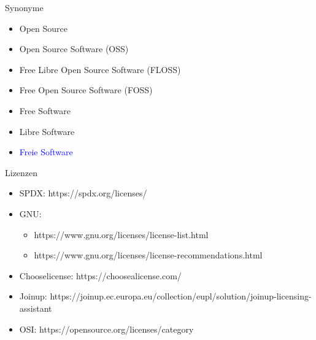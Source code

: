 



\begin{frame}
  \titlepage
\end{frame}

\begin{frame}{Synonyme}
  \begin{itemize}
  \item<1-> Open Source
  \item<4-> Open Source Software (OSS)
  \item<4-> Free Libre Open Source Software (FLOSS)
  \item<4-> Free Open Source Software (FOSS)
  \item<2-> Free Software
  \item<3-> Libre Software
  \item<5-> \textcolor{blue}{Freie Software}
  \end{itemize}
\end{frame}

\begin{frame}{Lizenzen}
\begin{itemize}
\item SPDX: https://spdx.org/licenses/
\item GNU:
\begin{itemize}
\item https://www.gnu.org/licenses/license-list.html
\item https://www.gnu.org/licenses/license-recommendations.html
\end{itemize}
\item Chooselicense: https://choosealicense.com/
\item Joinup: https://joinup.ec.europa.eu/collection/eupl/solution/joinup-licensing-assistant
\item OSI: https://opensource.org/licenses/category
\end{itemize}
\end{frame}

